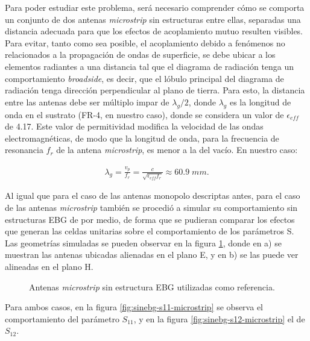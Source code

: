 Para poder estudiar este problema, será necesario comprender cómo se comporta un conjunto de dos antenas \textit{microstrip} sin estructuras entre ellas, separadas una distancia adecuada para que los efectos de acoplamiento mutuo resulten visibles. Para evitar, tanto como sea posible, el acoplamiento debido a fenómenos no relacionados a la propagación de ondas de superficie, se debe ubicar a los elementos radiantes a una distancia tal que el diagrama de radiación tenga un comportamiento \textit{broadside}, es decir, que el lóbulo principal del diagrama de radiación tenga dirección perpendicular al plano de tierra. Para esto, la distancia entre las antenas debe ser múltiplo impar de $\lambda_g/2$, donde $\lambda_g$ es la longitud de onda en el sustrato (FR-4, en nuestro caso), donde se considera un valor de $\epsilon_{eff}$ de 4.17. Este valor de permitividad modifica la velocidad de las ondas electromagnéticas, de modo que la longitud de onda, para la frecuencia de resonancia $f_r$ de la antena \textit{microstrip}, es menor a la del vacío. En nuestro caso:

\begin{align}
	\label{eq:lambdag}
	\lambda_g = \frac{v_p}{f_r} = \frac{c}{\sqrt{\epsilon_{eff} f_r}} \approx 60.9\; mm.
\end{align}


Al igual que para el caso de las antenas monopolo descriptas antes, para el caso de las antenas \textit{microstrip} también se procedió a simular su comportamiento sin estructuras EBG de por medio, de forma que se pudieran comparar los efectos que generan las celdas unitarias sobre el comportamiento de los parámetros S. Las geometrías simuladas se pueden observar en la figura \ref{fig:geometrias-sinebg-microstrip-EyH}, donde en a) se muestran las antenas ubicadas alienadas en el plano E, y en b) se las puede ver alineadas en el plano H.

\begin{figure}[H]
	\centering 
	\caption{Antenas \textit{microstrip} sin estructura EBG utilizadas como referencia.}
	\label{fig:geometrias-sinebg-microstrip-EyH}
\end{figure}

Para ambos casos, en la figura \ref{fig:sinebg-s11-microstrip} se observa el comportamiento del parámetro $S_{11}$, y en la figura \ref{fig:sinebg-s12-microstrip} el de $S_{12}$.


